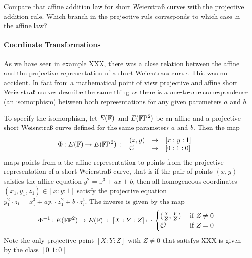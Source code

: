 


\begin{exercise}
Compare that affine addition law for short Weierstraß curves with the projective addition rule. Which branch in the projective rule corresponds to which case in the affine law? 
\end{exercise}

\paragraph{Coordinate Transformations} As we have seen in example XXX, there was a close relation between the affine and the projective representation of a short Weierstrass curve. This was no accident.
In fact from a mathematical point of view projective and affine short Weierstraß curves describe the same thing as there is a one-to-one correspondence (an isomorphism) between both representations for any given parameters $a$ and $b$. 

To specify the isomorphism, let $E(\mathbb{F})$ and $E(\mathbb{F}\mathrm{P}^2)$ be an affine and a projective short Weierstraß curve defined for the same parameters $a$ and $b$. Then the map
\begin{equation}
\Phi : E(\mathbb{F}) \to E(\mathbb{F}\mathrm{P}^2)\;:\;
\begin{array}{lcl}
(x,y)       &\mapsto & [x:y:1]\\
\mathcal{O} &\mapsto & [0:1:0]
\end{array}
\end{equation}
maps points from a the affine representation to points from the projective representation of a short Weierstraß curve, that is if the pair of points $(x,y)$ saisfies the affine equation $y^2= x^3 + ax + b$, then all homogeneous coordinates $(x_1,y_1,z_1)\in [x:y:1]$ satisfy the projective equation $y_1^2\cdot z_1= x_1^3 + ay_1\cdot z_1^2 + b\cdot z_1^3$. The inverse is given by the map
\begin{equation}
\Phi^{-1} : E(\mathbb{F}\mathbb{P}^2)\to E(\mathbb{F}) \;:\; [X:Y:Z] \mapsto \begin{cases}
(\frac{X}{Z},\frac{Y}{Z}) & \text{ if } Z\neq 0\\
\mathcal{O} & \text{ if } Z=0
\end{cases}
\end{equation}
Note the only projective point $[X:Y:Z]$ with $Z\neq 0$ that satisfys XXX is given by the class $[0:1:0]$. 

